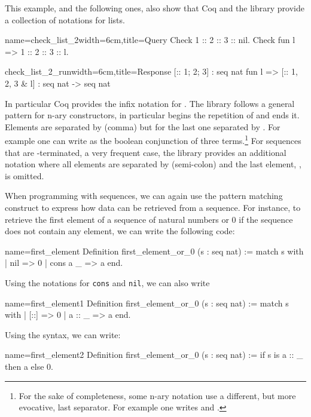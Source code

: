 This example, and the following ones, also show
that Coq and the \mcbMC{} library provide
a collection of notations for lists.

\begin{coq}{name=check_list_2}{width=6cm,title=Query}
Check 1 :: 2 :: 3 :: nil.
Check fun l => 1 :: 2 :: 3 :: l.
$~$
\end{coq}
\begin{coqout}{check_list_2_run}{width=6cm,title=Response}
[:: 1; 2; 3] : seq nat
fun l => [:: 1, 2, 3 & l]
  : seq nat -> seq nat
\end{coqout}

In particular Coq provides the infix notation \C{::} for
.  The \mcbMC{} library follows a general pattern for
n-ary constructors, in particular \C{[::} begins the repetition
of \C{::} and \C{]} ends it.  Elements are separated by \C{,} (comma)
but for the last one separated by \C{&}.
For example one
can write as  the boolean conjunction
of three terms.\footnote{For the sake of completeness, some n-ary notation use a
different, but more evocative, last separator.  For example one writes
\C{[|| b1, b2 | b3]} and \C{[==> b1, b2 => b3]}.}
For sequences that are -terminated, a very frequent case,
the \mcbMC{} library provides an additional notation where all elements are
separated by \C{;} (semi-colon) and the last element, ,
is omitted.

When programming with sequences, we can again use the  pattern matching
construct to express how data can be retrieved from a sequence.  For
instance, to retrieve the first element of a sequence of natural numbers
or 0 if the sequence does not contain any element, we can write the
following code:

\begin{coq}{name=first_element}{}
Definition first_element_or_0 (s : seq nat) :=
  match s with
  | nil => 0
  | cons a _ => a
  end.
\end{coq}
Using the notations for {\tt cons} and {\tt nil}, we can also write

\begin{coq}{name=first_element1}{}
Definition first_element_or_0 (s : seq nat) :=
  match s with
  | [::] => 0
  | a :: _ => a
  end.
\end{coq}
Using the  syntax, we can write:

\begin{coq}{name=first_element2}{}
Definition first_element_or_0 (s : seq nat) :=
  if s is a :: _ then a else 0.
\end{coq}
